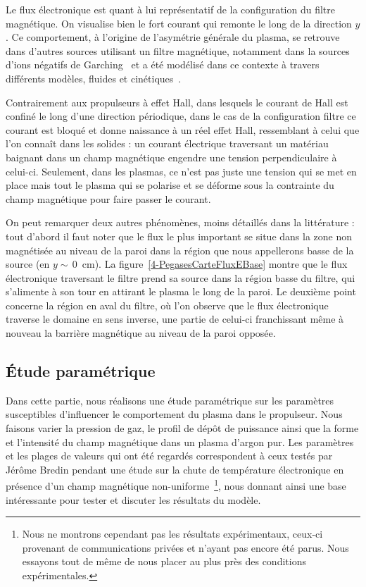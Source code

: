 \begin{refsection}
Le flux électronique est quant à lui représentatif de la configuration du filtre
magnétique. On visualise bien le fort courant qui
remonte le long de la direction $y$. Ce comportement, à l'origine de l'asymétrie
générale du plasma, se retrouve dans d'autres sources utilisant un filtre
magnétique, notamment dans la sources d'ions négatifs de
Garching~\parencite{Fantz} et a été modélisé dans ce contexte à travers
différents modèles, fluides et cinétiques~\parencite{PIC2D,PIC3D,MAGMA}.

Contrairement aux propulseurs à
effet Hall, dans lesquels le courant de Hall est confiné le long d'une
direction périodique, dans le cas de
la configuration filtre ce courant est bloqué et donne naissance à un réel effet 
Hall, ressemblant à celui que l'on connaît dans les solides : un courant
électrique traversant un matériau baignant dans un champ magnétique engendre une tension
perpendiculaire à celui-ci. Seulement, dans les plasmas, ce n'est pas juste une
tension qui se met en place mais tout le plasma qui se polarise et se déforme
sous la contrainte du champ magnétique pour faire passer le courant.

On peut remarquer
deux autres phénomènes, moins détaillés dans la littérature : tout d'abord il
faut noter que le flux le plus important se situe dans la zone non magnétisée au
niveau de la paroi dans la région que nous appellerons basse de la source (en
$y\sim\,$0~cm).
La figure~\ref{4-PegasesCarteFluxEBase} montre que le flux électronique
traversant le filtre prend sa source dans la région basse du filtre, qui
s'alimente à son tour en attirant le plasma le long de la paroi.
Le deuxième point concerne la région en aval du filtre, où l'on observe que le
flux électronique traverse le domaine en sens inverse, une partie de celui-ci franchissant même à nouveau
la barrière magnétique au niveau de la paroi opposée.

\subsection{Étude paramétrique}
Dans cette partie, nous
réalisons une étude paramétrique sur les paramètres susceptibles
d'influencer le comportement du plasma dans le propulseur. Nous faisons varier
la pression de gaz, le profil de dépôt de puissance ainsi que la forme et
l'intensité du champ magnétique dans un plasma d'argon pur. Les paramètres et
les plages de valeurs qui ont été regardés correspondent à ceux testés par
Jérôme Bredin pendant une étude sur la chute de température électronique en
présence d'un champ magnétique non-uniforme~\parencite{Bredin}\footnote{Nous ne
montrons cependant pas les résultats expérimentaux, ceux-ci provenant de
communications privées et n'ayant pas encore été parus. Nous essayons tout de
même de nous placer au plus près des conditions expérimentales.}, nous donnant
ainsi une base intéressante pour tester et discuter les résultats du modèle.


\end{refsection}
